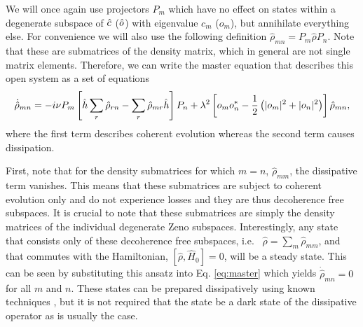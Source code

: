 We will once again use projectors $P_m$ which have no effect on states
within a degenerate subspace of $\hat{c}$ ($\hat{o}$) with eigenvalue $c_m$
($o_m$), but annihilate everything else. For convenience we will also
use the following definition $\hat{\rho}_{mn} = P_m \hat{\rho} P_n$.
Note that these are submatrices of the density matrix, which in
general are not single matrix elements. Therefore, we can write the
master equation that describes this open system as a set of equations
\begin{equation}
\label{eq:master}
  \dot{\hat{\rho}}_{mn} =  -i \nu P_m \left[ \hat{h} \sum_r \hat{\rho}_{rn}
    - \sum_r \hat{\rho}_{mr} \hat{h} \right] P_n + \lambda^2 \left[ o_m
    o_n^*  - \frac{1}{2} \left( |o_m|^2 + |o_n|^2 \right) \right] \hat{\rho}_{mn},
\end{equation}
where the first term describes coherent evolution whereas the second
term causes dissipation. 

First, note that for the density submatrices for which $m = n$,
$\hat{\rho}_{mm}$, the dissipative term vanishes. This means that
these submatrices are subject to coherent evolution only and do not
experience losses and they are thus decoherence free subspaces. It is
crucial to note that these submatrices are simply the density matrices
of the individual degenerate Zeno subspaces. Interestingly, any state
that consists only of these decoherence free subspaces, i.e.~
$\hat{\rho} = \sum_m \hat{\rho}_{mm}$, and that commutes with the
Hamiltonian, $[\hat{\rho}, \hat{H}_0] = 0$, will be a steady state.
This can be seen by substituting this ansatz into
Eq. \eqref{eq:master} which yields $\dot{\hat{\rho}}_{mn} = 0$ for all
$m$ and $n$. These states can be prepared dissipatively using known
techniques \cite{diehl2008}, but it is not required that the state be
a dark state of the dissipative operator as is usually the case.

